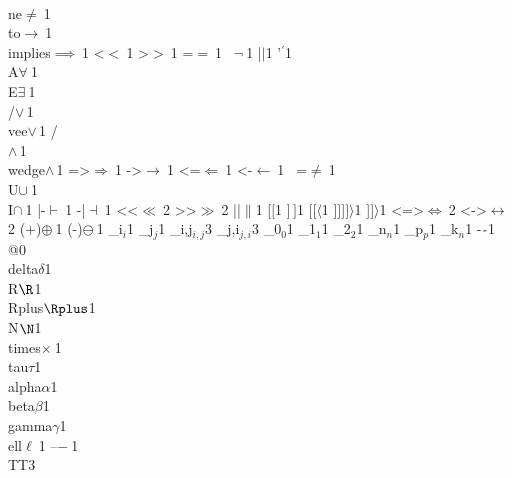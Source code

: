 {        {\\ne}{{$\ne\ $}}1
        {\\to}{{$\to\ $}}1
        {\\implies}{{$\implies\ $}}1
        {<}{{$<\ $}}1
        {>}{{$>\ $}}1
        {=}{{$=\ $}}1
        {~}{{$\neg\ $}}1
        {|}{{$\mid$}}1
        {'}{{$^\prime$}}1
        {\\A}{{$\forall\ $}}1
        {\\E}{{$\exists\ $}}1
        {\\/}{{$\vee\,$}}1
        {\\vee}{{$\vee\,$}}1
        {/\\}{{$\wedge\,$}}1
        {\\wedge}{{$\wedge\,$}}1
        {=>}{{$\Rightarrow\ $}}1
        {->}{{$\rightarrow\ $}}1
        {<=}{{$\Leftarrow\ $}}1
        {<-}{{$\leftarrow\ $}}1
        {~=}{{$\neq\ $}}1
        {\\U}{{$\cup\ $}}1
        {\\I}{{$\cap\ $}}1
        {|-}{{$\vdash\ $}}1
        {-|}{{$\dashv\ $}}1
        {<<}{{$\ll\ $}}2
        {>>}{{$\gg\ $}}2
        {||}{{$\|$}}1
        {[}{{$[$}}1
        {]}{{$\,]$}}1
        {[[}{{$\langle$}}1
        {]]]}{{$]\rangle$}}1
        {]]}{{$\rangle$}}1
        {<=>}{{$\Leftrightarrow\ $}}2
        {<->}{{$\leftrightarrow\ $}}2
        {(+)}{{$\oplus\ $}}1
        {(-)}{{$\ominus\ $}}1
        {_i}{{$_{i}$}}1
        {_j}{{$_{j}$}}1
        {_{i,j}}{{$_{i,j}$}}3
        {_{j,i}}{{$_{j,i}$}}3
        {_0}{{$_0$}}1
        {_1}{{$_1$}}1
        {_2}{{$_2$}}1
        {_n}{{$_n$}}1
        {_p}{{$_p$}}1
        {_k}{{$_n$}}1
        {-}{{$\ms{-}$}}1
        {@}{{}}0
        {\\delta}{{$\delta$}}1
        {\\R}{{$\R$}}1
        {\\Rplus}{{$\Rplus$}}1
        {\\N}{{$\N$}}1
        {\\times}{{$\times\ $}}1
        {\\tau}{{$\tau$}}1
        {\\alpha}{{$\alpha$}}1
        {\\beta}{{$\beta$}}1
        {\\gamma}{{$\gamma$}}1
        {\\ell}{{$\ell\ $}}1
        {--}{{$-\ $}}1
        {\\TT}{{\hspace{1.5em}}}3        
      }

